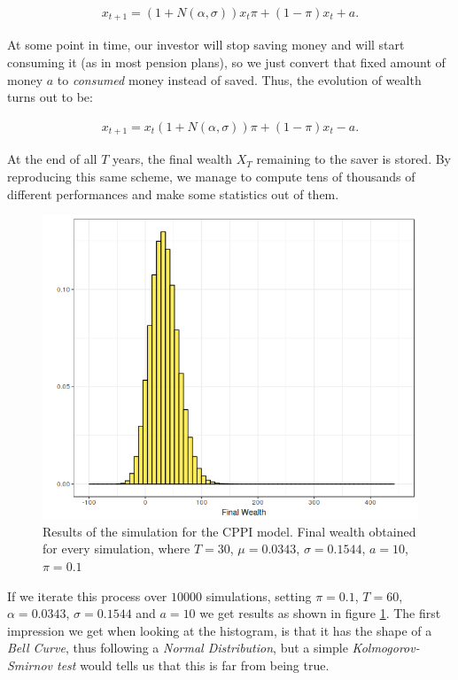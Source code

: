 \begin{align}
	x_{t+1} = (1+N(\alpha, \sigma))x_{t}\pi + (1 - \pi)x_{t} + a \textit{.}
\end{align}

At some point in time, our investor will stop saving money and will start consuming it (as in most pension plans), so we just convert that fixed amount of money $a$ to \emph{consumed} money instead of saved. Thus, the evolution of wealth turns out to be:

\begin{align}
	x_{t+1} = x_{t}(1+N(\alpha, \sigma))\pi + (1 - \pi)x_{t} - a \textit{.}
\end{align}

At the end of all $T$ years, the final wealth $X_T$ remaining to the saver is stored. By reproducing this same scheme, we manage to compute tens of thousands of different performances and make some statistics out of them.

\begin{figure}[H]
    \centering
    \includegraphics[scale=0.65]{./images/fw_cppi.png}
    \caption{Results of the simulation for the CPPI model. Final wealth obtained for every simulation, where $T=30$, $\mu = 0.0343$, $\sigma = 0.1544$, $a=10$, $\pi = 0.1$}
    \label{fig:cppi_fw}
\end{figure}

If we iterate this process over $10000$ simulations, setting $\pi = 0.1$, $T = 60$, $\alpha = 0.0343$, $\sigma = 0.1544$ and $a = 10$ we get results as shown in figure \ref{fig:cppi_fw}. The first impression we get when looking at the histogram, is that it has the shape of a \textit{Bell Curve}, thus following a \textit{Normal Distribution}, but a simple \textit{Kolmogorov-Smirnov test} would tells us that this is far from being true.


